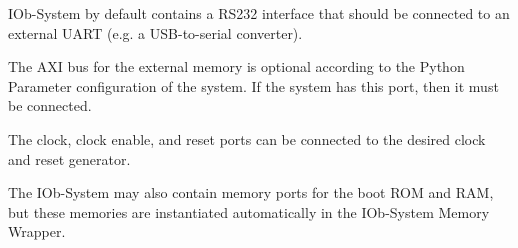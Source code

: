 %

IOb-System by default contains a RS232 interface that should be connected to an external UART (e.g. a USB-to-serial converter).

The AXI bus for the external memory is optional according to the Python Parameter configuration of the system. If the system has this port, then it must be connected.

The clock, clock enable, and reset ports can be connected to the desired clock and reset generator.

The IOb-System may also contain memory ports for the boot ROM and RAM, but these memories are instantiated automatically in the IOb-System Memory Wrapper.
